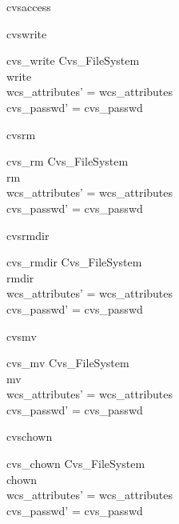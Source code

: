 \begin{zedgroup}
\begin{doc}{cvsaccess}
  \end{doc}
  \begin{doc}{cvswrite}
    \begin{schema}{cvs\_write}
      \Delta Cvs\_FileSystem\\
      write \\
      \where
      wcs\_attributes' = wcs\_attributes \\
      cvs\_passwd' = cvs\_passwd \\ 
    \end{schema}
  \end{doc}
  \begin{doc}{cvsrm}
    \begin{schema}{cvs\_rm}
      \Delta Cvs\_FileSystem\\
      rm \\
      \where
      wcs\_attributes' = wcs\_attributes \\
      cvs\_passwd' = cvs\_passwd \\ 
    \end{schema}
  \end{doc}
  \begin{doc}{cvsrmdir}
    \begin{schema}{cvs\_rmdir}
      \Delta Cvs\_FileSystem\\
      rmdir \\
      \where
      wcs\_attributes' = wcs\_attributes \\
      cvs\_passwd' = cvs\_passwd \\ 
    \end{schema}
  \end{doc}
  \begin{doc}{cvsmv}
    \begin{schema}{cvs\_mv}
      \Delta Cvs\_FileSystem\\
      mv \\
      \where
      wcs\_attributes' = wcs\_attributes \\
      cvs\_passwd' = cvs\_passwd \\ 
    \end{schema}
  \end{doc}
  \begin{doc}{cvschown}
    \begin{schema}{cvs\_chown}
      \Delta Cvs\_FileSystem\\
      chown \\
      \where
      wcs\_attributes' = wcs\_attributes \\
      cvs\_passwd' = cvs\_passwd \\ 

\end{schema}
\end{doc}
\end{zedgroup}
